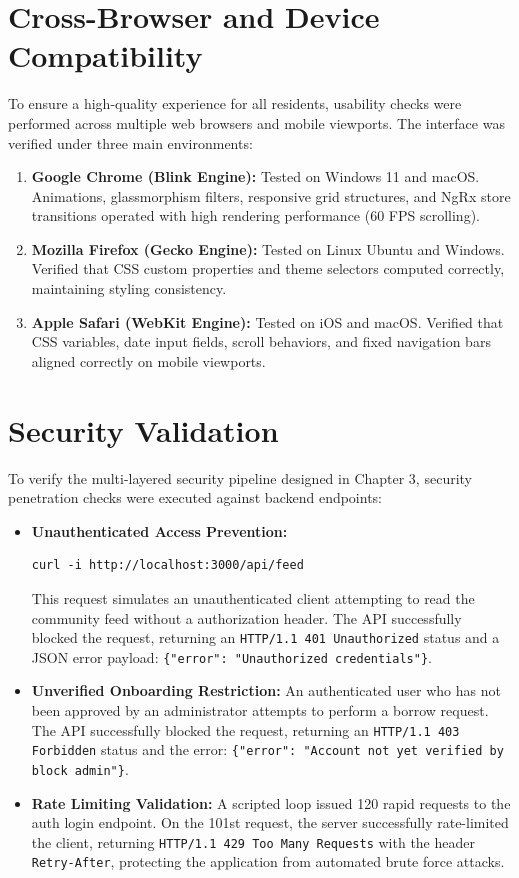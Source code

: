 \section{Cross-Browser and Device Compatibility}
To ensure a high-quality experience for all residents, usability checks were performed across multiple web browsers and mobile viewports.
The interface was verified under three main environments:
\begin{enumerate}
    \item \textbf{Google Chrome (Blink Engine):} Tested on Windows 11 and macOS. Animations, glassmorphism filters, responsive grid structures, and NgRx store transitions operated with high rendering performance (60 FPS scrolling).
    \item \textbf{Mozilla Firefox (Gecko Engine):} Tested on Linux Ubuntu and Windows. Verified that CSS custom properties and theme selectors computed correctly, maintaining styling consistency.
    \item \textbf{Apple Safari (WebKit Engine):} Tested on iOS and macOS. Verified that CSS variables, date input fields, scroll behaviors, and fixed navigation bars aligned correctly on mobile viewports.
\end{enumerate}

\section{Security Validation}
To verify the multi-layered security pipeline designed in Chapter 3, security penetration checks were executed against backend endpoints:
\begin{itemize}
    \item \textbf{Unauthenticated Access Prevention:}
    \begin{lstlisting}
curl -i http://localhost:3000/api/feed
    \end{lstlisting}
    This request simulates an unauthenticated client attempting to read the community feed without a authorization header. The API successfully blocked the request, returning an \texttt{HTTP/1.1 401 Unauthorized} status and a JSON error payload: \texttt{\{"error": "Unauthorized credentials"\}}.
    
    \item \textbf{Unverified Onboarding Restriction:}
    An authenticated user who has not been approved by an administrator attempts to perform a borrow request. The API successfully blocked the request, returning an \texttt{HTTP/1.1 403 Forbidden} status and the error: \texttt{\{"error": "Account not yet verified by block admin"\}}.
    
    \item \textbf{Rate Limiting Validation:}
    A scripted loop issued 120 rapid requests to the auth login endpoint. On the 101st request, the server successfully rate-limited the client, returning \texttt{HTTP/1.1 429 Too Many Requests} with the header \texttt{Retry-After}, protecting the application from automated brute force attacks.
\end{itemize}

